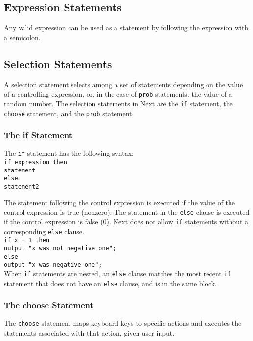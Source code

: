 \documentclass[12pt]{article}
\begin{document}
\subsection{Expression Statements}
Any valid expression can be used as a statement by following the expression with a semicolon.

\subsection{Selection Statements}
A selection statement selects among a set of statements depending on the value of a controlling expression, or, in the case of \texttt{prob} statements, the value of a random number.  The selection statements in Next are the \texttt{if} statement, the \texttt{choose} statement, and the \texttt{prob} statement.

\subsubsection{The if Statement}

The \texttt{if} statement has the following syntax: \\

\texttt{if expression then \\
\indent \indent statement \\
\indent else \\
\indent \indent statement2 \\
}

\noindent The statement following the control expression is executed if the value of the control expression is true (nonzero).  The statement in the \texttt{else} clause is executed if the control expression is false (0).  Next does not allow \texttt{if} statements without a corresponding \texttt{else} clause.  \\

\texttt{if x + 1 then \\
\indent \indent output "x was not negative one";} \\
\indent \texttt{else \\
\indent \indent output "x was negative one";} \\

\noindent When \texttt{if} statements are nested, an \texttt{else} clause matches the most recent \texttt{if} statement that does not have an \texttt{else} clause, and is in the same block.

\subsubsection{The choose Statement}
The \texttt{choose} statement maps keyboard keys to specific actions and executes the statements associated with that action, given user input. \\
\end{document}
